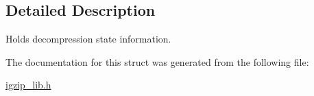 \subsection{Detailed Description}
Holds decompression state information. 

The documentation for this struct was generated from the following file\-:\begin{DoxyCompactItemize}
\item 
\hyperlink{igzip__lib_8h}{igzip\-\_\-lib.\-h}\end{DoxyCompactItemize}
